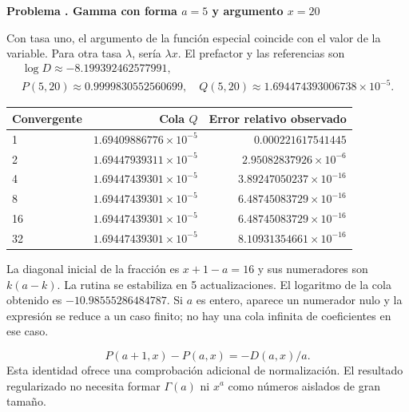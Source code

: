 \documentclass[11pt,a4paper]{article}
\theoremstyle{definition}
\newcounter{problema}
\newenvironment{resuelto}[1]{\refstepcounter{problema}\par\medskip\Needspace{6\baselineskip}\textbf{Problema \theproblema. #1}\par}{\par\medskip}
\begin{document}
\begin{resuelto}{Gamma con forma $a=5$ y argumento $x=20$}
Con tasa uno, el argumento de la función especial coincide con el valor de la variable. Para otra tasa $\lambda$, sería $\lambda x$. El prefactor y las referencias son
\[
\begin{gathered}
\log D\approx-8.199392462577991,\\
P(5,20)\approx0.9999830552560699,\quad Q(5,20)\approx1.694474393006738\times10^{-5}.
\end{gathered}
\]

\begin{center}\small\begin{tabular}{lrr}
\toprule
Convergente & Cola $Q$ & Error relativo observado\\\midrule
1 & $1.69409886776\times10^{-5}$ & $0.000221617541445$\\
2 & $1.69447939311\times10^{-5}$ & $2.95082837926\times10^{-6}$\\
4 & $1.69447439301\times10^{-5}$ & $3.89247050237\times10^{-16}$\\
8 & $1.69447439301\times10^{-5}$ & $6.48745083729\times10^{-16}$\\
16 & $1.69447439301\times10^{-5}$ & $6.48745083729\times10^{-16}$\\
32 & $1.69447439301\times10^{-5}$ & $8.10931354661\times10^{-16}$\\
\bottomrule\end{tabular}\end{center}

La diagonal inicial de la fracción es $x+1-a=16$ y sus numeradores son $k(a-k)$. La rutina se estabiliza en 5 actualizaciones. El logaritmo de la cola obtenido es $-10.98555286484787$.
Si $a$ es entero, aparece un numerador nulo y la expresión se reduce a un caso finito; no hay una cola infinita de coeficientes en ese caso.

\[
P(a+1,x)-P(a,x)=-D(a,x)/a.
\]
Esta identidad ofrece una comprobación adicional de normalización. El resultado regularizado no necesita formar $\Gamma(a)$ ni $x^a$ como números aislados de gran tamaño.
\end{resuelto}
\end{document}
